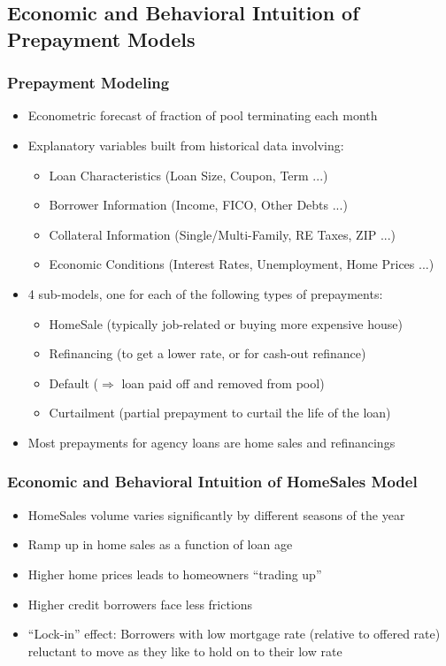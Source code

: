 \documentclass{beamer}
\begin{document}
\subsection{Economic and Behavioral Intuition of Prepayment Models}
\begin{frame}
\frametitle{Prepayment Modeling}
\begin{itemize}
\item Econometric forecast of fraction of pool terminating each month
\item Explanatory variables built from historical data involving:
\begin{itemize}
\item Loan Characteristics (Loan Size, Coupon, Term ...)
\item Borrower Information (Income, FICO, Other Debts ...)
\item Collateral Information (Single/Multi-Family, RE Taxes, ZIP ...)
\item Economic Conditions (Interest Rates, Unemployment, Home Prices ...)
\end{itemize}
\item 4 sub-models, one for each of the following types of prepayments:
\begin{itemize}
\item HomeSale (typically job-related or buying more expensive house)
\item Refinancing (to get a lower rate, or for cash-out refinance)
\item Default ($\Rightarrow$ loan paid off and removed from pool)
\item Curtailment (partial prepayment to curtail the life of the loan)
\end{itemize}
\item Most prepayments for agency loans are home sales and refinancings
\end{itemize}
\end{frame}

\begin{frame}
\frametitle{Economic and Behavioral Intuition of HomeSales Model}
\begin{itemize}
\item HomeSales volume varies significantly by different seasons of the year
\item Ramp up in home sales as a function of loan age
\item Higher home prices leads to homeowners ``trading up''
\item Higher credit borrowers face less frictions
\item ``Lock-in'' effect: Borrowers with low mortgage rate (relative to offered rate) reluctant to move as they like to hold on to their low rate
\end{itemize}
\end{frame}
\end{document}
